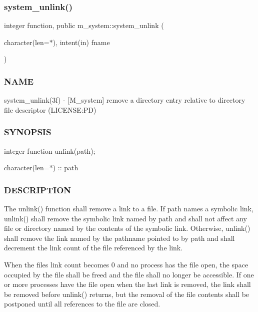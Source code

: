 \subsubsection{\texorpdfstring{system\+\_\+unlink()}{system\_unlink()}}
{\footnotesize\ttfamily integer function, public m\+\_\+system\+::system\+\_\+unlink (\begin{DoxyParamCaption}\item[{character(len=$\ast$), intent(in)}]{fname }\end{DoxyParamCaption})}



\subsubsection*{N\+A\+ME}

system\+\_\+unlink(3f) -\/ \mbox{[}M\+\_\+system\mbox{]} remove a directory entry relative to directory file descriptor (L\+I\+C\+E\+N\+SE\+:PD) 

\subsubsection*{S\+Y\+N\+O\+P\+S\+IS}

\begin{DoxyVerb}integer function unlink(path);

 character(len=*) :: path
\end{DoxyVerb}


\subsubsection*{D\+E\+S\+C\+R\+I\+P\+T\+I\+ON}

The unlink() function shall remove a link to a file. If path names a symbolic link, unlink() shall remove the symbolic link named by path and shall not affect any file or directory named by the contents of the symbolic link. Otherwise, unlink() shall remove the link named by the pathname pointed to by path and shall decrement the link count of the file referenced by the link.

When the file\textquotesingle{}s link count becomes 0 and no process has the file open, the space occupied by the file shall be freed and the file shall no longer be accessible. If one or more processes have the file open when the last link is removed, the link shall be removed before unlink() returns, but the removal of the file contents shall be postponed until all references to the file are closed.

